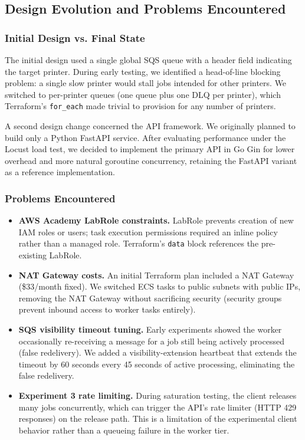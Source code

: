 \documentclass[11pt,letterpaper]{article}
\newcommand{\code}[1]{\texttt{\small #1}}
\begin{document}
\subsection{Design Evolution and Problems Encountered}

\subsubsection{Initial Design vs. Final State}
The initial design used a single global SQS queue with a header field indicating the target printer. During early testing, we identified a head-of-line blocking problem: a single slow printer would stall jobs intended for other printers. We switched to per-printer queues (one queue plus one DLQ per printer), which Terraform's \code{for\_each} made trivial to provision for any number of printers.

A second design change concerned the API framework. We originally planned to build only a Python FastAPI service. After evaluating performance under the Locust load test, we decided to implement the primary API in Go Gin for lower overhead and more natural goroutine concurrency, retaining the FastAPI variant as a reference implementation.

\subsubsection{Problems Encountered}
\begin{itemize}[noitemsep]
  \item \textbf{AWS Academy LabRole constraints.} LabRole prevents creation of new IAM roles or users; task execution permissions required an inline policy rather than a managed role. Terraform's \code{data} block references the pre-existing LabRole.
  \item \textbf{NAT Gateway costs.} An initial Terraform plan included a NAT Gateway (\$33/month fixed). We switched ECS tasks to public subnets with public IPs, removing the NAT Gateway without sacrificing security (security groups prevent inbound access to worker tasks entirely).
  \item \textbf{SQS visibility timeout tuning.} Early experiments showed the worker occasionally re-receiving a message for a job still being actively processed (false redelivery). We added a visibility-extension heartbeat that extends the timeout by 60 seconds every 45 seconds of active processing, eliminating the false redelivery.
  \item \textbf{Experiment 3 rate limiting.} During saturation testing, the client releases many jobs concurrently, which can trigger the API's rate limiter (HTTP 429 responses) on the release path. This is a limitation of the experimental client behavior rather than a queueing failure in the worker tier.
\end{itemize}
\end{document}
